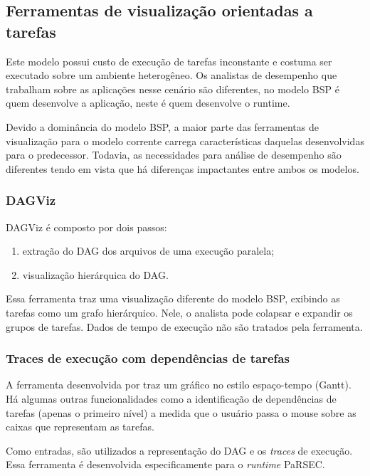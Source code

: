 \subsection{Ferramentas de visualização orientadas a tarefas}

Este modelo possui custo de execução de tarefas inconstante e costuma ser 
executado sobre um ambiente heterogêneo. Os analistas de desempenho que 
trabalham sobre as aplicações nesse cenário são diferentes, no modelo 
BSP é quem desenvolve a aplicação, neste é quem desenvolve o runtime. 

Devido a dominância do modelo BSP, a maior parte das ferramentas de 
visualização para o modelo corrente carrega características daquelas 
desenvolvidas para o predecessor. Todavia, as necessidades para análise de 
desempenho são diferentes tendo em vista que há diferenças impactantes entre 
ambos os modelos.


\subsubsection{DAGViz}

DAGViz \cite{ref:dagviz} é composto por dois passos: 

\begin{enumerate}
    \item extração do DAG dos arquivos de uma execução paralela;
    \item visualização hierárquica do DAG.
\end{enumerate}

Essa ferramenta traz uma visualização diferente do modelo BSP, exibindo as 
tarefas como um grafo hierárquico. Nele, o analista pode colapsar e expandir os 
grupos de tarefas. Dados de tempo de execução não são tratados pela ferramenta.

\subsubsection{Traces de execução com dependências de tarefas}

A ferramenta desenvolvida por \citet{ref:visuexecdep} traz um gráfico no estilo 
espaço-tempo (Gantt). Há algumas outras funcionalidades como a identificação de 
dependências de tarefas (apenas o primeiro nível) a medida que o usuário passa o 
mouse sobre as caixas que representam as tarefas.

Como entradas, são utilizados a representação do DAG e os \emph{traces} de 
execução. Essa ferramenta é desenvolvida especificamente para o 
\emph{runtime} PaRSEC.

